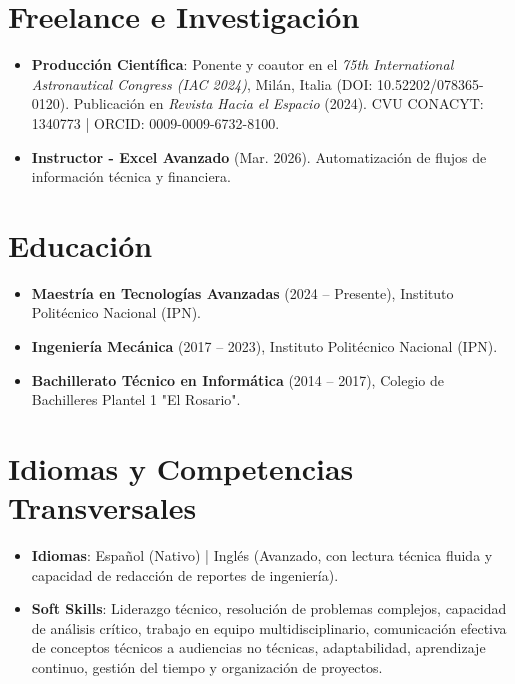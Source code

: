 \documentclass[10pt,letterpaper]{article}
\newcommand{\CVItem}[1]{\item #1}
\begin{document}
\section*{Freelance e Investigación}
\begin{itemize}[leftmargin=*, itemsep=0.2ex]
    \CVItem{\textbf{Producción Científica}: Ponente y coautor en el \textit{75th International Astronautical Congress (IAC 2024)}, Milán, Italia (DOI: 10.52202/078365-0120). Publicación en \textit{Revista Hacia el Espacio} (2024). CVU CONACYT: 1340773 | ORCID: 0009-0009-6732-8100.}
    \CVItem{\textbf{Instructor - Excel Avanzado} (Mar. 2026). Automatización de flujos de información técnica y financiera.}
\end{itemize}

\section*{Educación}
\begin{itemize}[leftmargin=*, itemsep=0.2ex]
    \CVItem{\textbf{Maestría en Tecnologías Avanzadas} (2024 -- Presente), Instituto Politécnico Nacional (IPN).}
    \CVItem{\textbf{Ingeniería Mecánica} (2017 -- 2023), Instituto Politécnico Nacional (IPN).}
    \CVItem{\textbf{Bachillerato Técnico en Informática} (2014 -- 2017), Colegio de Bachilleres Plantel 1 "El Rosario".}
\end{itemize}

\section*{Idiomas y Competencias Transversales}
\begin{itemize}[leftmargin=*, itemsep=0.2ex]
    \CVItem{\textbf{Idiomas}: Español (Nativo) | Inglés (Avanzado, con lectura técnica fluida y capacidad de redacción de reportes de ingeniería).}
    \CVItem{\textbf{Soft Skills}: Liderazgo técnico, resolución de problemas complejos, capacidad de análisis crítico, trabajo en equipo multidisciplinario, comunicación efectiva de conceptos técnicos a audiencias no técnicas, adaptabilidad, aprendizaje continuo, gestión del tiempo y organización de proyectos.}
\end{itemize}
\end{document}
